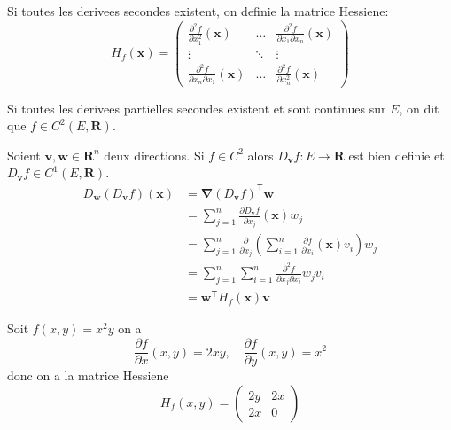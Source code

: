 Si toutes les derivees secondes existent, on definie la matrice Hessiene:
$$
H_{f}(\boldsymbol{x})=\begin{pmatrix}
\frac{ \partial^{2}f }{ \partial x_{1}^{2} }(\boldsymbol{x}) &\dots & \frac{ \partial^{2}f }{ \partial x_{1}\partial x_{n} }(\boldsymbol{x})  \\
\vdots & \ddots & \vdots \\
\frac{ \partial^{2}f }{ \partial x_{n}\partial x_{1} }(\boldsymbol{x}) &\dots & \frac{ \partial^{2}f }{ \partial x_{n}^{2} } (\boldsymbol{x})    
\end{pmatrix}
$$

\begin{definition}
Si toutes les derivees partielles secondes existent et sont continues sur $E$, on dit que $f\in C^{2}(E,\mathbf{R})$.
\end{definition}
\begin{definition}
Soient $\boldsymbol{v},\boldsymbol{w}\in \mathbf{R}^{n}$ deux directions. Si $f\in C^{2}$ alors $D_{\boldsymbol{v}}f:E\to \mathbf{R}$ est bien definie et $D_{\boldsymbol{v}}f\in C^{1}(E,\mathbf{R})$.
\begin{align*}
D_{\boldsymbol{w}}(D_{\boldsymbol{v}}f)(\boldsymbol{x}) & =\boldsymbol{\nabla}(D_{\boldsymbol{v}}f)^{\mathsf{T}}\boldsymbol{w} \\
 & =\sum_{j=1}^{n}  \frac{ \partial D_{\boldsymbol{v}}f }{ \partial x_{j} } (\boldsymbol{x})w_{j} \\
 & =\sum_{j=1}^{n} \frac{ \partial  }{ \partial x_{j} } \left( \sum_{i=1}^{n} \frac{ \partial f }{ \partial x_{i} } (\boldsymbol{x})v_{i} \right)w_{j} \\
 & =\sum_{j=1}^{n} \sum_{i=1}^{n}  \frac{ \partial^{2}f }{ \partial x_{j}\partial x_{i} }w_{j}v_{i}  \\
 & = \boldsymbol{w}^{\mathsf{T}}H_{f}(\boldsymbol{x})\boldsymbol{v}
\end{align*}
\end{definition}
\begin{example}
Soit $f(x,y)=x^{2}y$ on a 
$$
\frac{ \partial f }{ \partial x } (x,y)=2xy,\quad \frac{ \partial f }{ \partial y } (x,y)=x^{2}
$$
donc on a la matrice Hessiene
$$
H_{f}(x,y)=\begin{pmatrix}
2y & 2x \\
2x & 0
\end{pmatrix}
$$
\end{example}

